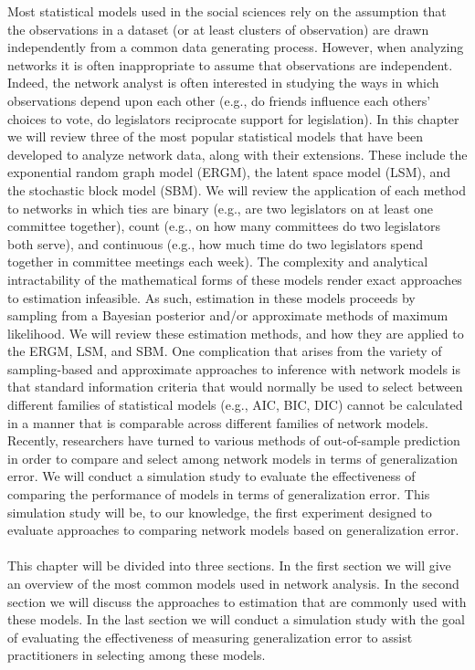 \documentclass[fleqn,12pt]{wlscirep}
\title{\centering{Chapter 48 Outline\\
\large{Network-Analysis: Estimation and Inference}
}}
\author[1]{John P. Schoeneman}
\author[1]{Bruce A.  Desmarais}
\affil[1]{Penn State, Political Science, University Park, Pond Lab}
\begin{document}
\flushbottom
\maketitle{}
\vspace{-1.5cm}
Most statistical models used in the social sciences rely on the assumption that the observations in a dataset (or at least clusters of observation) are drawn independently from a common data generating process.  However, when analyzing networks it is often inappropriate to assume that observations are independent. Indeed, the network analyst is often interested in studying the ways in which observations depend upon each other (e.g., do friends influence each others' choices to vote, do legislators reciprocate support for legislation). In this chapter we will review three of the most popular statistical models that have been developed to analyze network data, along with their extensions. These include the exponential random graph model (ERGM), the latent space model (LSM),  and the stochastic block model (SBM). We will review the application of each method to networks in which ties are binary (e.g., are two legislators on at least one committee together), count (e.g., on how many committees do two legislators both serve), and continuous (e.g., how much time do two legislators spend together in committee meetings each week). The complexity and analytical intractability of the mathematical forms of these models render exact approaches to estimation infeasible. As such, estimation in these models proceeds by sampling from a Bayesian posterior and/or approximate methods of maximum likelihood. We will review these estimation methods, and how they are applied to the ERGM, LSM, and SBM. One complication that arises from the variety of sampling-based and approximate approaches to inference with network models is that standard information criteria that would normally be used to select between different families of statistical models (e.g., AIC, BIC, DIC) cannot be calculated in a manner that is comparable across different families of network models. Recently, researchers have turned to various methods of out-of-sample prediction in order to compare and select among network models in terms of generalization error. We will conduct a simulation study to evaluate the effectiveness of comparing the performance of models in terms of generalization error. This simulation study will be, to our knowledge, the first experiment designed to evaluate approaches to comparing network models based on generalization error.
\\~\\
This chapter will be divided into three sections. In the first section we will give an overview of the most common models used in network analysis. In the second section we will discuss the approaches to estimation that are commonly used with these models. In the last section we will conduct a simulation study with the goal of evaluating the effectiveness of measuring generalization error to assist practitioners in selecting among these models.
\end{document}
